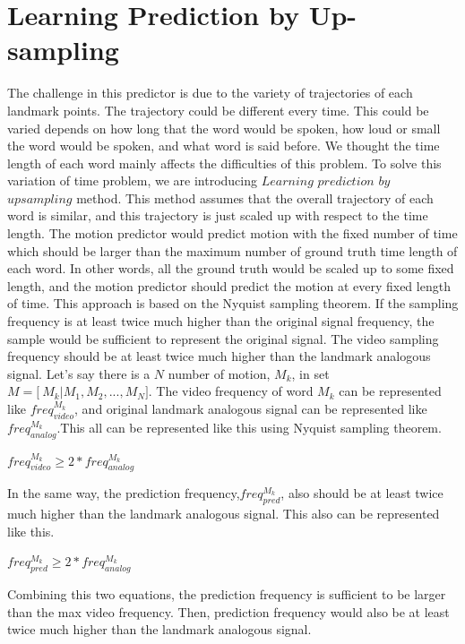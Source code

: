 \documentclass[10pt,twocolumn,letterpaper]{article}
\begin{document}
\section{Learning Prediction by Up-sampling}
The challenge in this predictor is due to the variety of trajectories of each landmark points. The trajectory could be different every time. This could be varied depends on how long that the word would be spoken, how loud or small the word would be spoken, and what word is said before. We thought the time length of each word mainly affects the difficulties of this problem.
To solve this variation of time problem, we are introducing $Learning$ $ prediction$ $by$ $upsampling$ method. This method assumes that the overall trajectory of each word is similar, and this trajectory is just scaled up with respect to the time length. The motion predictor would predict motion with the fixed number of time which should be larger than the maximum number of ground truth time length of each word. In other words, all the ground truth would be scaled up to some fixed length, and the motion predictor should predict the motion at every fixed length of time.
This approach is based on the Nyquist sampling theorem. If the sampling frequency is at least twice much higher than the original signal frequency, the sample would be sufficient to represent the original signal. The video sampling frequency should be at least twice much higher than the landmark analogous signal. Let's say there is a $N$ number of motion, $M_k$, in set $M = \big[\ M_k|M_1,M_2, ... , M_N\big]$. The video frequency of word $M_k$ can be represented like  $freq_{video}^{M_k}$, and original landmark analogous signal can be represented like $freq_{analog}^{M_k}$.This all can be represented like this using Nyquist sampling theorem.

\bigskip
\begin{center}
$freq_{video}^{M_k} \geq 2 \ast freq_{analog}^{M_k} $
\end{center}
\bigskip

In the same way, the prediction frequency,$freq_{pred}^{M_k}$, also should be at least twice much higher than the landmark analogous signal. This also can be represented like this.

\bigskip
\begin{center}
$freq_{pred}^{M_k} \geq 2 \ast freq_{analog}^{M_k} $
\end{center}
\bigskip

Combining this two equations, the prediction frequency is sufficient to be larger than the max video frequency. Then, prediction frequency would also be at least twice much higher than the landmark analogous signal.
\end{document}
